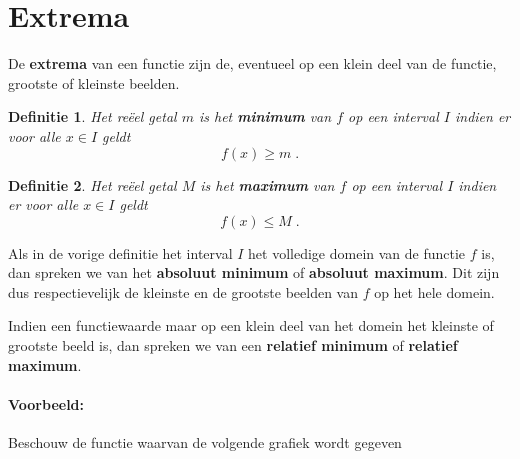 \documentclass[12pt,twoside]{article}
\newtheorem{definition}{Definitie}
\begin{document}
\newpage

\section{Extrema}

\begin{theorie}
De {\bf extrema} van een functie zijn de, eventueel op een klein deel van de functie, grootste of kleinste beelden.

\begin{definition}
  Het reëel getal $m$ is het {\bf minimum} van $f$ op een interval $I$ indien er voor alle $x\in I$ geldt
  $$f(x)\geq m\;.$$
\end{definition}

\begin{definition}
  Het reëel getal $M$ is het {\bf maximum} van $f$ op een interval $I$ indien er voor alle $x\in I$ geldt
  $$f(x)\leq M\;.$$
\end{definition}

Als in de vorige definitie het interval $I$ het volledige domein van de functie $f$ is, dan spreken we van het {\bf absoluut minimum} of {\bf absoluut maximum}. Dit zijn dus respectievelijk de kleinste en de grootste beelden van $f$ op het hele domein.

Indien een functiewaarde maar op een klein deel van het domein het kleinste of grootste beeld is, dan spreken we van een {\bf relatief minimum} of {\bf relatief maximum}.

\paragraph*{Voorbeeld:} Beschouw de functie waarvan de volgende grafiek wordt gegeven

\begin{center}
\end{center}


\end{theorie}
\end{document}
